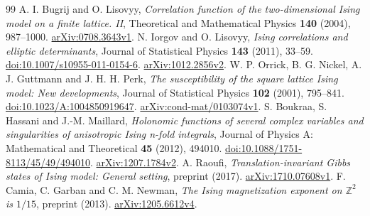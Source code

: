 \documentclass[11pt]{article}
\numberwithin{equation}{section}
\theoremstyle{definition}
\begin{document}
\begin{thebibliography}{99}
 A. I. Bugrij and O. Lisovyy,
\emph{Correlation function of the two-dimensional Ising model on a
finite lattice. II}, Theoretical and Mathematical Physics \textbf{140}
(2004), 987--1000. \href{https://arxiv.org/abs/0708.3643v1}{arXiv:0708.3643v1}.
 N. Iorgov and O. Lisovyy,
\emph{Ising correlations and elliptic determinants},
Journal of Statistical Physics \textbf{143} (2011), 33--59.
\href{https://doi.org/10.1007/s10955-011-0154-6}{doi:10.1007/s10955-011-0154-6}.
\href{https://arxiv.org/abs/1012.2856v2}{arXiv:1012.2856v2}.
 W. P. Orrick, B. G. Nickel, A. J. Guttmann and J. H. H. Perk,
\emph{The susceptibility of the square lattice Ising model: New developments},
Journal of Statistical Physics \textbf{102} (2001), 795--841.
\href{https://doi.org/10.1023/A:1004850919647}{doi:10.1023/A:1004850919647}.
\href{https://arxiv.org/abs/cond-mat/0103074v1}{arXiv:cond-mat/0103074v1}.
 S. Boukraa, S. Hassani and J.-M. Maillard,
\emph{Holonomic functions of several complex variables and singularities
of anisotropic Ising n-fold integrals}, Journal of Physics A:
Mathematical and Theoretical \textbf{45} (2012), 494010.
\href{https://doi.org/10.1088/1751-8113/45/49/494010}{doi:10.1088/1751-8113/45/49/494010}.
\href{https://arxiv.org/abs/1207.1784v2}{arXiv:1207.1784v2}.
 A. Raoufi,
\emph{Translation-invariant Gibbs states of Ising model: General setting},
preprint (2017).
\href{https://arxiv.org/abs/1710.07608v1}{arXiv:1710.07608v1}.
 F. Camia, C. Garban and C. M. Newman,
\emph{The Ising magnetization exponent on \(\mathbb Z^2\) is \(1/15\)},
preprint (2013).
\href{https://arxiv.org/abs/1205.6612v4}{arXiv:1205.6612v4}.

\end{thebibliography}
\end{document}
